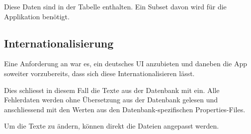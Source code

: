 Diese Daten sind in der Tabelle  enthalten.
Ein Subset davon wird für die Applikation benötigt.

\subsection{Internationalisierung}
\label{datenquellen-internationalisierung}
Eine Anforderung an \kort{} war es, ein deutsches UI anzubieten und daneben die App soweiter vorzubereits, dass sich diese Internationalisieren lässt.

Dies schliesst in diesem Fall die Texte aus der Datenbank mit ein.
Alle Fehlerdaten werden ohne Übersetzung aus der Datenbank gelesen und anschliessend mit den Werten aus den Datenbank-spezifischen Properties-Files.

Um die Texte zu ändern, können direkt die Dateien angepasst werden.